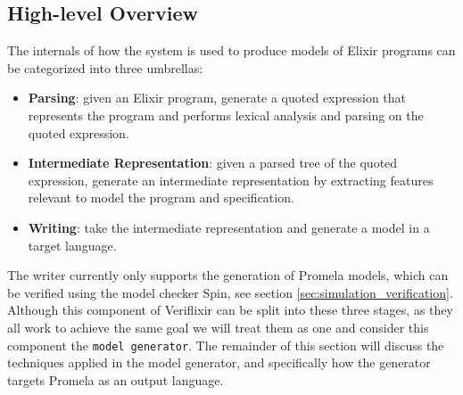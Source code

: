 \subsection{High-level Overview}
The internals of how the system is used to produce models of Elixir programs can be categorized into three umbrellas:
\begin{itemize}
    \item \textbf{Parsing}: given an Elixir program, generate a quoted expression that represents the program and performs lexical analysis and parsing on the quoted expression.
    \item \textbf{Intermediate Representation}: given a parsed tree of the quoted expression, generate an intermediate representation by extracting features relevant to model the program and specification.
    \item \textbf{Writing}: take the intermediate representation and generate a model in a target language.
\end{itemize} 
The writer currently only supports the generation of Promela models, which can be verified using the model checker Spin, see section \ref{sec:simulation_verification}. Although this component of Veriflixir can be split into these three stages, as they all work to achieve the same goal we will treat them as one and consider this component the \texttt{model generator}. The remainder of this section will discuss the techniques applied in the model generator, and specifically how the generator targets Promela as an output language.
